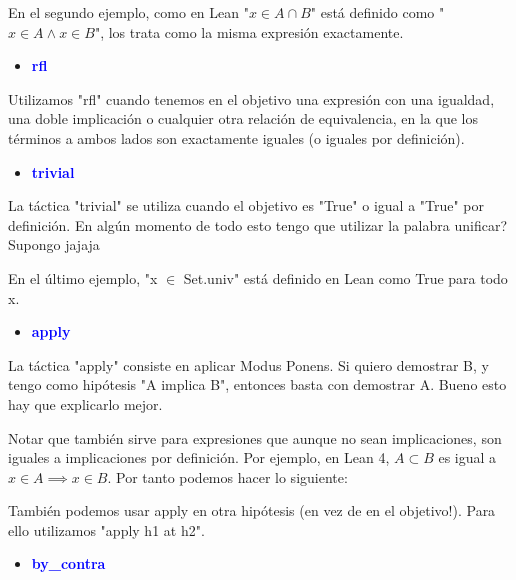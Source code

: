 \documentclass{article}
\begin{document}
En el segundo ejemplo, como en Lean "$x \in A \cap B$" está definido como "$x \in A \land x \in B$", los trata como la misma expresión exactamente.

\begin{itemize}
  \item \textbf{\textcolor{blue}{rfl}}
\end{itemize}

Utilizamos "rfl" cuando tenemos en el objetivo una expresión con una igualdad, una doble implicación o cualquier otra relación de equivalencia, en la que los términos a ambos lados son exactamente iguales (o iguales por definición).


\begin{itemize}
  \item \textbf{\textcolor{blue}{trivial}}
\end{itemize}

La táctica "trivial" se utiliza cuando el objetivo es "True" o igual a "True" por definición. En algún momento de todo esto tengo que utilizar la palabra unificar? Supongo jajaja


En el último ejemplo, "x $\in$ Set.univ" está definido en Lean como True para todo x.

\begin{itemize}
  \item \textbf{\textcolor{blue}{apply}}
\end{itemize}

La táctica "apply" consiste en aplicar Modus Ponens. Si quiero demostrar B, y tengo como hipótesis "A implica B", entonces basta con demostrar A. Bueno esto hay que explicarlo mejor.

Notar que también sirve para expresiones que aunque no sean implicaciones, son iguales a implicaciones por definición. Por ejemplo, en Lean 4, $A \subset B$ es igual a $x \in A \implies x \in B$. Por tanto podemos hacer lo siguiente:


También podemos usar apply en otra hipótesis (en vez de en el objetivo!). Para ello utilizamos "apply h1 at h2".


\begin{itemize}
  \item \textbf{\textcolor{blue}{by\_contra}}
\end{itemize}
\end{document}
